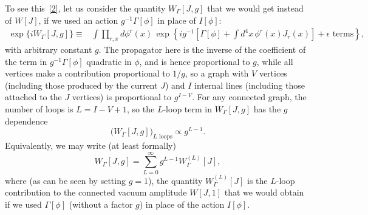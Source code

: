 To see this~\hyperref[ch16-ref-2]{[2]}, let us consider the quantity $W_\Gamma[J,g]$ that we would get
instead of $W[J]$, if we used an action $g^{-1}\Gamma[\phi]$ in place of $I[\phi]$:
\begin{align}
\exp\{iW_\Gamma[J,g]\}
\equiv{}&\int\prod_{r,x}d\phi^r(x)\,
\exp\!\left\{ig^{-1}\left[\Gamma[\phi]+\int d^4x\,\phi^r(x)J_r(x)\right]
+\epsilon\text{ terms}\right\},
\label{eq:16.1.9}
\end{align}
with arbitrary constant $g$. The propagator here is the inverse of the
coefficient of the term in $g^{-1}\Gamma[\phi]$ quadratic in $\phi$, and is hence proportional
to $g$, while all vertices make a contribution proportional to $1/g$, so a graph
with $V$ vertices (including those produced by the current $J$) and $I$ internal
lines (including those attached to the $J$ vertices) is proportional to $g^{I-V}$.
For any connected graph, the number of loops is $L=I-V+1$, so the
$L$-loop term in $W_\Gamma[J,g]$ has the $g$ dependence
\begin{equation}
\bigl(W_\Gamma[J,g]\bigr)_{L\text{ loops}}\propto g^{L-1}.
\label{eq:16.1.10}
\end{equation}
Equivalently, we may write (at least formally)
\begin{equation}
W_\Gamma[J,g]=\sum_{L=0}^{\infty}g^{L-1}W_\Gamma^{(L)}[J],
\label{eq:16.1.11}
\end{equation}
where (as can be seen by setting $g=1$), the quantity $W_\Gamma^{(L)}[J]$ is the $L$-loop
contribution to the connected vacuum amplitude $W[J,1]$ that we would
obtain if we used $\Gamma[\phi]$ (without a factor $g$) in place of the action $I[\phi]$.

